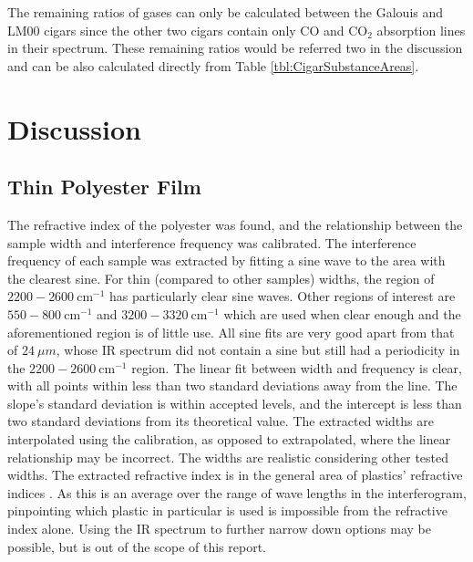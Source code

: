 \documentclass[reprint,amsmath,amssymb,aps, prl,superscriptaddress]{revtex4-2}
\begin{document}
The remaining ratios of gases can only be calculated between the Galouis and LM00 cigars since the other two cigars contain only CO and $\text{CO}_{2}$ absorption lines in their spectrum. These remaining ratios would be referred two in the discussion and can be also calculated directly from Table \ref{tbl:CigarSubstanceAreas}.

\section{Discussion}
\subsection{Thin Polyester Film}
The refractive index of the polyester was found, and the relationship between the sample width and interference frequency was calibrated.
The interference frequency of each sample was extracted by fitting a sine wave to the area with the clearest sine. For thin (compared to other samples) widths, the region of $2200-2600\ \text{cm}^{-1}$ has particularly clear sine waves.
Other regions of interest are $550-800\ \text{cm}^{-1}$ and $3200-3320\ \text{cm}^{-1}$ which are used when clear enough and the aforementioned region is of little use.
All sine fits are very good apart from that of $24\ \mu m$, whose IR spectrum did not contain a sine but still had a periodicity in the $2200-2600\ \text{cm}^{-1}$ region.
The linear fit between width and frequency is clear, with all points within less than two standard deviations away from the line.
The slope's standard deviation is within accepted levels, and the intercept is less than two standard deviations from its theoretical value.
The extracted widths are interpolated using the calibration, as opposed to extrapolated, where the linear relationship may be incorrect. The widths are realistic considering other tested widths.
The extracted refractive index is in the general area of plastics' refractive indices \cite{plasticRefract}. As this is an average over the range of wave lengths in the interferogram, pinpointing which plastic in particular is used is impossible from the refractive index alone. Using the IR spectrum to further narrow down options may be possible, but is out of the scope of this report.
\end{document}
